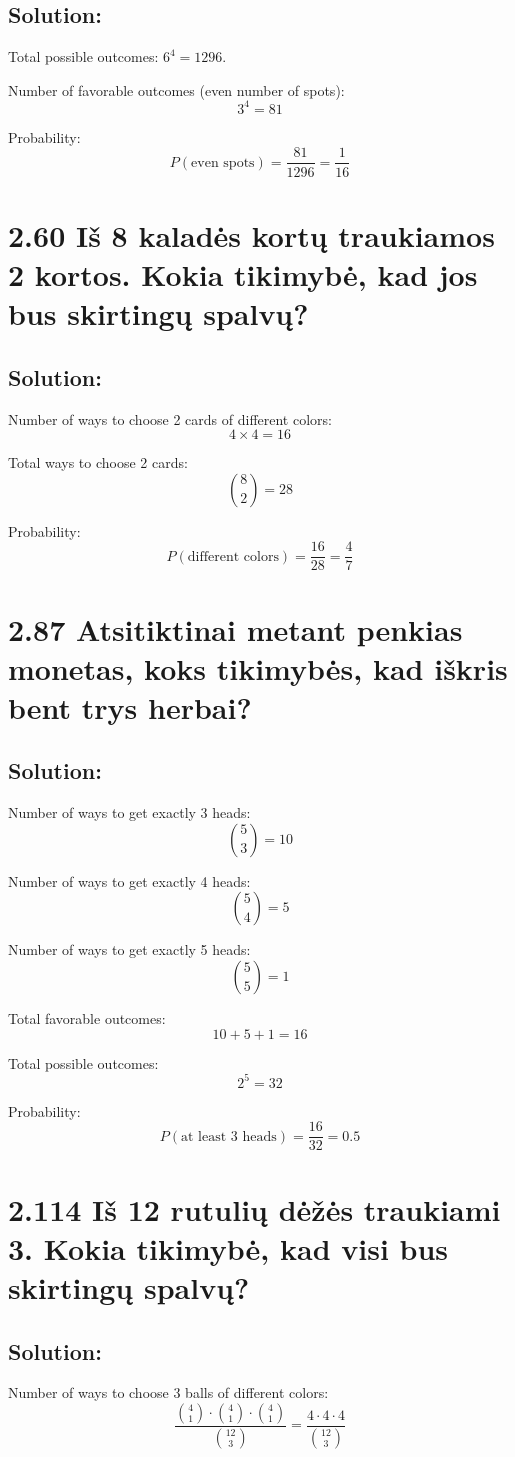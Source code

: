 \documentclass{article}
\begin{document}
{\subsection*{Solution:}
Total possible outcomes: \(6^4 = 1296\).

Number of favorable outcomes (even number of spots):
\[
3^4 = 81
\]

Probability:
\[
P(\text{even spots}) = \frac{81}{1296} = \frac{1}{16}
\]

\section*{2.60 Iš 8 kaladės kortų traukiamos 2 kortos. Kokia tikimybė, kad jos bus skirtingų spalvų?}
\subsection*{Solution:}
Number of ways to choose 2 cards of different colors:
\[
4 \times 4 = 16
\]

Total ways to choose 2 cards:
\[
\binom{8}{2} = 28
\]

Probability:
\[
P(\text{different colors}) = \frac{16}{28} = \frac{4}{7}
\]

\section*{2.87 Atsitiktinai metant penkias monetas, koks tikimybės, kad iškris bent trys herbai?}
\subsection*{Solution:}
Number of ways to get exactly 3 heads:
\[
\binom{5}{3} = 10
\]

Number of ways to get exactly 4 heads:
\[
\binom{5}{4} = 5
\]

Number of ways to get exactly 5 heads:
\[
\binom{5}{5} = 1
\]

Total favorable outcomes:
\[
10 + 5 + 1 = 16
\]

Total possible outcomes:
\[
2^5 = 32
\]

Probability:
\[
P(\text{at least 3 heads}) = \frac{16}{32} = 0.5
\]

\section*{2.114 Iš 12 rutulių dėžės traukiami 3. Kokia tikimybė, kad visi bus skirtingų spalvų?}
\subsection*{Solution:}
Number of ways to choose 3 balls of different colors:
\[
\frac{\binom{4}{1} \cdot \binom{4}{1} \cdot \binom{4}{1}}{\binom{12}{3}} = \frac{4 \cdot 4 \cdot 4}{\binom{12}{3}}
\]

}
\end{document}
